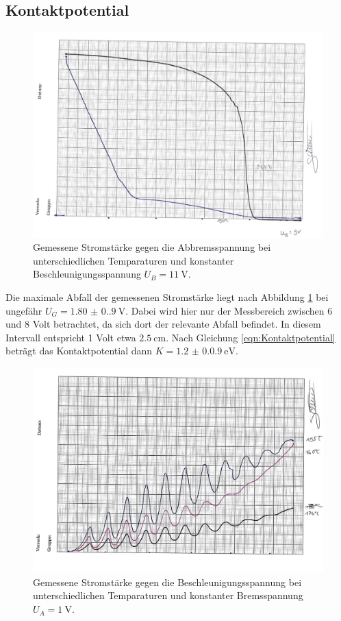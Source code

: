 \subsection{Kontaktpotential}
\begin{figure}[H]
    \includegraphics[width=\textwidth]{Bilder/1.jpg}
    \caption{Gemessene Stromstärke gegen die Abbremsspannung bei unterschiedlichen Temparaturen und konstanter Beschleunigungsspannung
    $U_B=\qty{11}{\volt}$.}
    \label{fig:1}
\end{figure}

Die maximale Abfall der gemessenen Stromstärke liegt nach Abbildung \ref{fig:1} bei ungefähr $U_G=\qty{1.80(0.9)}{\volt}$.
Dabei wird hier nur der Messbereich zwischen 6 und 8 Volt betrachtet, da sich dort der relevante Abfall befindet. In diesem
Intervall entspricht 1 Volt etwa $\qty{2.5}{\centi\meter}$. Nach Gleichung \ref{eqn:Kontaktpotential} beträgt das 
Kontaktpotential dann $K=\qty{1.2(0.09)}{\electronvolt}$.


\begin{figure}[H]
    \includegraphics[width=\textwidth]{Bilder/2.jpg}
    \caption{Gemessene Stromstärke gegen die Beschleunigungsspannung bei unterschiedlichen Temparaturen und konstanter Bremsspannung
    $U_A=\qty{1}{\volt}$.}
    \label{fig:2}
\end{figure}


